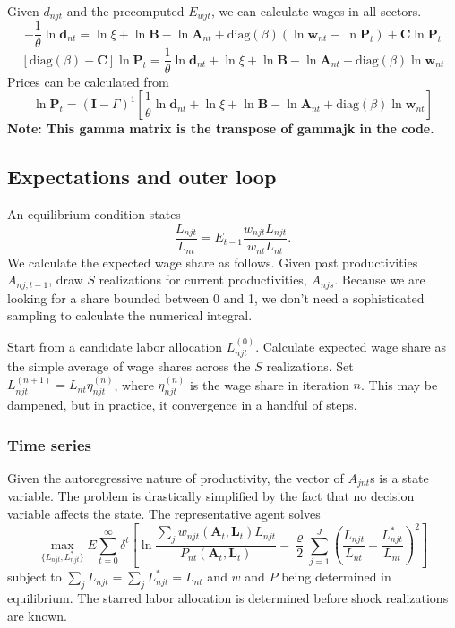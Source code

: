 \documentclass[12pt]{article}
\begin{document}
Given $d_{njt}$ and the precomputed $E_{wjt}$, we can calculate wages in all sectors. 
\[
-\frac1\theta \ln\mathbf d_{nt} = 
\ln\xi
	+ \ln\mathbf B
	- \ln\mathbf A_{nt}
+\text{diag}(\beta)(\ln\mathbf w_{nt}-\ln\mathbf P_{t})
+ \mathbf C \ln\mathbf P_{t}  
\]
\[
[\text{diag}(\beta)
- \mathbf C] \ln\mathbf P_{t} =  
\frac1\theta \ln\mathbf d_{nt} +
\ln\xi
	+ \ln\mathbf B
	- \ln\mathbf A_{nt}
+\text{diag}(\beta)\ln\mathbf w_{nt}
\]
Prices can be calculated from
\[
\ln\mathbf P_{t} =  
(\mathbf I - \Gamma)^{1}
[\frac1\theta \ln\mathbf d_{nt} +
\ln\xi
	+ \ln\mathbf B
	- \ln\mathbf A_{nt}
+\text{diag}(\beta)\ln\mathbf w_{nt}]
\]
\textbf{Note: This gamma matrix is the transpose of gammajk in the code.}


\subsection{Expectations and outer loop}
An equilibrium condition states
\begin{equation}
	\frac 
		{L_{njt}}
		{L_{nt}}
	=
	E_{t-1}\frac 
		{w_{njt}L_{njt}}
		{w_{nt}L_{nt}}.
\end{equation}
We calculate the expected wage share as follows. Given past productivities $A_{nj,t-1}$, draw $S$ realizations for current productivities, $A_{njs}$. Because we are looking for a share bounded between 0 and 1, we don't need a sophisticated sampling to calculate the numerical integral. 

Start from a candidate labor allocation $L_{njt}^{(0)}$. Calculate expected wage share as the simple average of wage shares across the $S$ realizations. Set $L_{njt}^{(n+1)} = L_{nt}\eta_{njt}^{(n)}$, where $\eta_{njt}^{(n)}$ is the wage share in iteration $n$. This may be dampened, but in practice, it convergence in a handful of steps.

\subsubsection{Time series}
Given the autoregressive nature of productivity, the vector of $A_{jnt}$s is a state variable. The problem is drastically simplified by the fact that no decision variable affects the state. The representative agent solves
\[
\max_{\{L_{njt}, L_{njt}^*\}}
E
\sum_{t=0}^{\infty} 
	\delta^{t} 
	\left[
	\ln \frac 
		{\sum_j w_{njt}(\mathbf A_{t}, \mathbf L_{t})L_{njt}}
		{P_{nt}(\mathbf A_{t}, \mathbf L_{t})}
	-\frac \varrho 2
		\sum_{j=1}^J
		\left(
			\frac {L_{njt}} {L_{nt}}
			- 
			\frac {L_{njt}^*} {L_{nt}}
		\right)^2
	\right]
\]
subject to $\sum_j L_{njt}=\sum_j L_{njt}^*=L_{nt}$ and $w$ and $P$ being determined in equilibrium. The starred labor allocation is determined before shock realizations are known.
\end{document}
